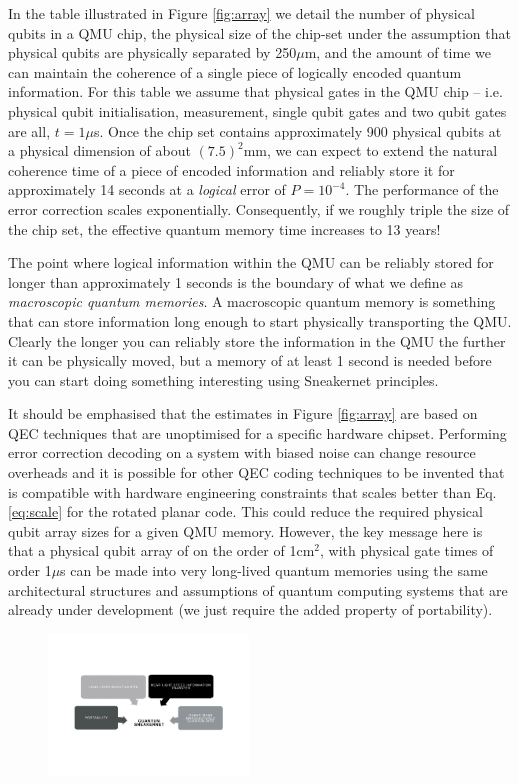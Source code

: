 \documentclass[twocolumn, aps, rmp, amsmath, amssymb, nofootinbib, superscriptaddress, longbibliography, floatfix, table-of-contents, eqsecnum]{revtex4-2}
\begin{document}
In the table illustrated in Figure \ref{fig:array} we detail the number of physical qubits in a QMU chip, the physical size of the chip-set under the assumption that physical qubits are physically separated by 250$\mu$m, and the amount of time we can maintain the coherence of a single piece of logically encoded quantum information. For this table we assume that physical gates in the QMU chip -- i.e. physical qubit initialisation, measurement, single qubit gates and two qubit gates are all, $t = 1\mu$s. Once the chip set contains approximately 900 physical qubits at a physical dimension of about $(7.5)^2$mm, we can expect to extend the natural coherence time of a piece of encoded information and reliably store it for approximately 14 seconds at a \textit{logical} error of $P= 10^{-4}$.  The performance of the error correction scales exponentially. Consequently, if we roughly triple the size of the chip set, the effective quantum memory time increases to 13 years!

The point where logical information within the QMU can be reliably stored for longer than approximately 1 seconds is the boundary of what we define as \textit{macroscopic quantum memories}. A macroscopic quantum memory is something that can store information long enough to start physically transporting the QMU. Clearly the longer you can reliably store the information in the QMU the further it can be physically moved, but a memory of at least 1 second is needed before you can start doing something interesting using Sneakernet principles.

It should be emphasised that the estimates in Figure \ref{fig:array} are based on QEC techniques that are unoptimised for a specific hardware chipset. Performing error correction decoding on a system with biased noise can change resource overheads and it is possible for other QEC coding techniques to be invented that is compatible with hardware engineering constraints that scales better than Eq. \ref{eq:scale} for the rotated planar code. This could reduce the required physical qubit array sizes for a given QMU memory. However, the key message here is that a physical qubit array of on the order of 1cm$^2$, with physical gate times of order 1$\mu$s can be made into very long-lived quantum memories using the same architectural structures and assumptions of quantum computing systems that are already under development (we just require the added property of portability). 

\begin{figure}[htbp!]
	\includegraphics[clip=true, width=0.475\textwidth]{goal}
	\caption{}
	\label{fig:goal}
\end{figure}
\end{document}
